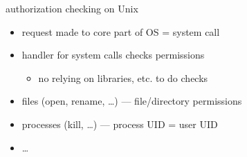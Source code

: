 \begin{frame}{authorization checking on Unix}
    \begin{itemize}
    \item request made to core part of OS = system call
    \item handler for system calls checks permissions
        \begin{itemize}
        \item no relying on libraries, etc. to do checks
        \end{itemize}
    \vspace{.5cm}
    \item files (open, rename, \ldots) --- file/directory permissions
    \item processes (kill, \ldots) --- process UID = user UID
    \item \ldots
    \end{itemize}
\end{frame}
